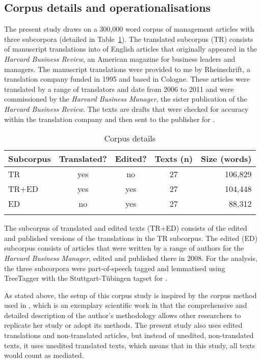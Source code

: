 \documentclass[output=paper]{LSP/langsci}
\begin{document}
\subsection{Corpus details and operationalisations}\label{bisiada:sec:corp}

The present study draws on a 300,000 word corpus of management articles with three subcorpora (detailed in Table~\ref{bisiada:tab:corpus}). The translated subcorpus (TR) consists of manuscript translations into  of English articles that originally appeared in the \emph{Harvard Business Review}, an American magazine for business leaders and managers. The manuscript translations were provided to me by Rheinschrift, a translation company funded in 1995 and based in Cologne. These articles were translated by a range of translators and date from 2006 to 2011 and were commissioned by the \emph{Harvard Business Manager}, the  sister publication of the \emph{Harvard Business Review}. The texts are drafts that were checked for accuracy within the translation company and then sent to the publisher for .

\begin{table}
  \caption{Corpus details}\label{bisiada:tab:corpus}
  \begin{tabular}{lcccr}
    \lsptoprule
    Subcorpus& Translated?  & Edited?  & Texts (n)  & Size (words)\\
    \midrule
    TR      & yes       & no          & 27            & 106,829\\
    TR+ED   & yes       & yes         & 27            & 104,448\\
    ED      & no        & yes         & 27            & 88,312\\
    \lspbottomrule
  \end{tabular}
\end{table}

\noindent The subcorpus of translated and edited texts (TR+ED) consists of the edited and published versions of the translations in the TR subcorpus. The edited (ED) subcorpus consists of articles that were written by a range of authors for the \emph{Harvard Business Manager}, edited and published there in 2008. For the analysis, the three subcorpora were part-of-speech tagged and lemmatised using TreeTagger \parencite{schmid95} with the Stuttgart-Tübingen tagset for  \parencite{schetal99}.

As stated above, the setup of this corpus study is inspired by the corpus method used in \textcite{kruger12}, which is an exemplary scientific work in that the comprehensive and detailed description of the author's methodology allows other researchers to replicate her study or adopt its methods. The present study also uses edited translations and non-translated articles, but instead of unedited, non-translated texts, it uses unedited translated texts, which means that in this study, all texts would count as mediated.
\end{document}
